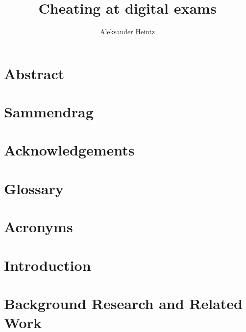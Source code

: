 \documentclass{tudelft-report}
\begin{document}
\frontmatter

\title[A comprehensive look at cheating at digital exams at NTNU]{Cheating at digital exams}
\author{Aleksander Heintz}
\makecover



\chapter*{Abstract}

\chapter*{Sammendrag}


\chapter*{Acknowledgements}


%

\renewcommand{\baselinestretch}{0.8}
\tableofcontents
\listoffigures
\renewcommand{\baselinestretch}{1.7}

\chapter{Glossary}


\chapter{Acronyms}


\mainmatter

\chapter{Introduction}\label{cha:1}









\chapter{Background Research and Related Work}\label{cha:2}



\end{document}
